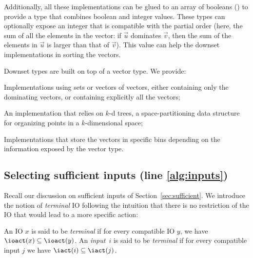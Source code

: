 \documentclass[runningheads,a4paper]{llncs}
\begin{document}
\vspace{.5em}

Additionally, all these implementations can be glued to an array of booleans
() to provide a type that combines boolean and integer
values.  These types can optionally expose an integer that is compatible with
the partial order (here, the sum of all the elements in the vector: if
\(\vec{u}\) dominates \(\vec{v}\), then the sum of the elements in \(\vec{u}\) is
larger than that of \(\vec{v}\)).  This value can help the downset implementations
in sorting the vectors.

Downset types are built on top of a vector type.  We provide:
\begin{compactitem}
\item Implementations using sets or vectors of vectors, either containing only
  the dominating vectors, or containing explicitly all the vectors;
\item An implementation that relies on \(k\)-d trees, a space-partitioning data
  structure for organizing points in a \(k\)-dimensional space;~\cite{bcko08}
\item Implementations that store the vectors in specific bins depending on the
  information exposed by the vector type.
\end{compactitem}

\subsection{Selecting sufficient inputs (line \ref{alg:inputs})}\label{sec:suff}


Recall our discussion on sufficient inputs of Section~\ref{sec:sufficient}.  We
introduce the notion of \emph{terminal} IO following the intuition that there is
no restriction of the IO that would lead to a more specific action:
\begin{definition}
  An IO \(x\) is said to be \emph{terminal} if for every compatible IO \(y\), we
  have \(\ioact(x) \subseteq \ioact(y)\).  An \emph{input}~\(i\) is said to be
  \emph{terminal} if for every compatible input \(j\) we have
  \(\iact(i) \subseteq \iact(j)\).
\end{definition}
\end{document}
